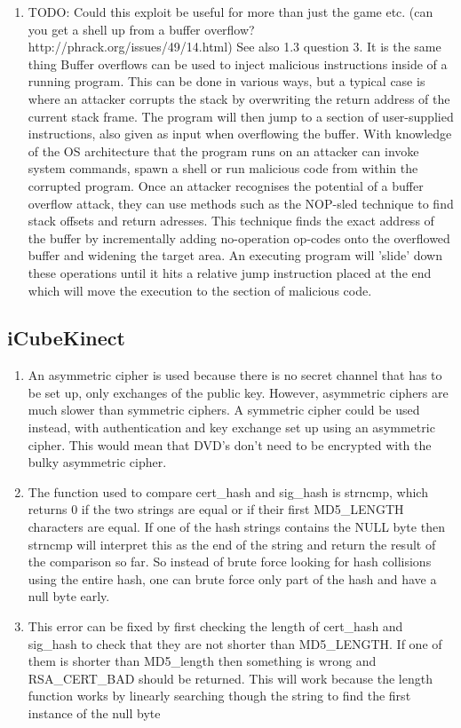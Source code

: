 \documentclass[9pt,a4paper]{article}
\begin{document}
\begin{enumerate}
\item TODO: Could this exploit be useful for more than just the game etc. (can you get a shell up from a buffer overflow? http://phrack.org/issues/49/14.html) See also 1.3 question 3. It is the same thing
Buffer overflows can be used to inject malicious instructions inside of a running program. This can be done in various ways, but a typical case is where an attacker corrupts the stack by overwriting the return address of the current stack frame. The program will then jump to a section of user-supplied instructions, also given as input when overflowing the buffer. With knowledge of the OS architecture that the program runs on an attacker can invoke system commands, spawn a shell or run malicious code from within the corrupted program. Once an attacker recognises the potential of a buffer overflow attack, they can use methods such as the NOP-sled technique to find stack offsets and return adresses. This technique finds the exact address of the buffer by incrementally adding no-operation op-codes onto the overflowed buffer and widening the target area. An executing program will 'slide' down these operations until it hits a relative jump instruction placed at the end which will move the execution to the section of malicious code.
\end{enumerate}

\subsection{iCubeKinect}
\begin{enumerate}
\item An asymmetric cipher is used because there is no secret channel that has to be set up, only exchanges of the public key. However, asymmetric ciphers are much slower than symmetric ciphers. A symmetric cipher could be used instead, with authentication and key exchange set up using an asymmetric cipher. This would mean that DVD's don't need to be encrypted with the bulky asymmetric cipher.
\item The function used to compare cert\_hash and sig\_hash is strncmp, which returns 0 if the two strings are equal or if their first MD5\_LENGTH characters are equal. If one of the hash strings contains the NULL byte then strncmp will interpret this as the end of the string and return the result of the comparison so far. So instead of brute force looking for hash collisions using the entire hash, one can brute force only part of the hash and have a null byte early.
\item This error can be fixed by first checking the length of cert\_hash and sig\_hash to check that they are not shorter than MD5\_LENGTH. If one of them is shorter than MD5\_length then something is wrong and RSA\_CERT\_BAD should be returned. This will work because the length function works by linearly searching though the string to find the first instance of the null byte
\end{enumerate}
\end{document}
